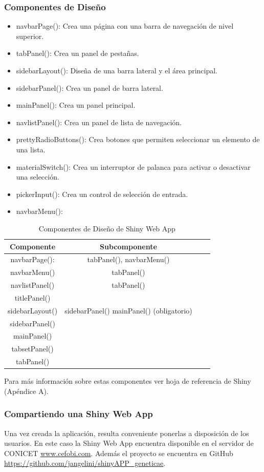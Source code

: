 \subsubsection{Componentes de Diseño}
\begin{itemize}
\item navbarPage(): Crea una página con una barra de navegación de nivel superior.
\item tabPanel(): Crea un panel de pestañas.
\item sidebarLayout(): Diseña de una barra lateral y el área principal.
\item sidebarPanel(): Crea un panel de barra lateral.
\item mainPanel(): Crea un panel principal.
\item navlistPanel(): Crea un panel de lista de navegación.
\item prettyRadioButtons(): Crea botones que permiten seleccionar un elemento de una lista.
\item materialSwitch(): Crea un interruptor de palanca para activar o desactivar una selección.
\item pickerInput(): Crea un control de selección de entrada.
\item navbarMenu():
\end{itemize}

{\small
\begin{table}[h]
\begin{center}
\caption{Componentes de Diseño de Shiny Web App}
\label{tab:tabla2}
\resizebox{0.6\textwidth}{!} {
\begin{tabular}{cccc}
\hline 
Componente	& Subcomponente	 \\
\hline
navbarPage(): & tabPanel(), navbarMenu()\\
navbarMenu() & tabPanel() \\
navlistPanel() & tabPanel()\\
titlePanel() &	\\
sidebarLayout() & sidebarPanel()  mainPanel() (obligatorio)	\\
sidebarPanel() & \\
mainPanel() & \\
tabsetPanel() &	\\
tabPanel()	 & \\
\hline
\end{tabular}
}
\end{center}
\end{table}
}


Para más información sobre estas componentes ver hoja de referencia de Shiny (Apéndice A).


\subsubsection{Compartiendo una Shiny Web App}

Una vez creada la aplicación, resulta conveniente ponerlas a disposición de los usuarios. En este caso la Shiny Web App encuentra disponible en el servidor de CONICET \url{www.cefobi.com}. Además el proyecto se encuentra en GitHub \url{https://github.com/jangelini/shinyAPP_geneticae}. 
